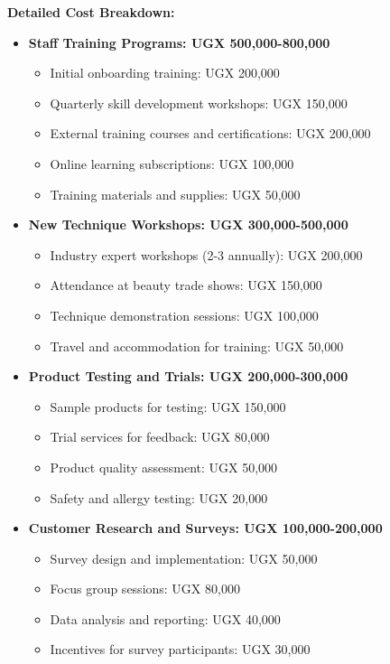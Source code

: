 \documentclass[a4paper,12pt]{article}
\begin{document}
\textbf{Detailed Cost Breakdown:}
\begin{itemize}[leftmargin=2em]
    \item \textbf{Staff Training Programs: UGX 500,000-800,000}
    \begin{itemize}
        \item Initial onboarding training: UGX 200,000
        \item Quarterly skill development workshops: UGX 150,000
        \item External training courses and certifications: UGX 200,000
        \item Online learning subscriptions: UGX 100,000
        \item Training materials and supplies: UGX 50,000
    \end{itemize}
    
    \item \textbf{New Technique Workshops: UGX 300,000-500,000}
    \begin{itemize}
        \item Industry expert workshops (2-3 annually): UGX 200,000
        \item Attendance at beauty trade shows: UGX 150,000
        \item Technique demonstration sessions: UGX 100,000
        \item Travel and accommodation for training: UGX 50,000
    \end{itemize}
    
    \item \textbf{Product Testing and Trials: UGX 200,000-300,000}
    \begin{itemize}
        \item Sample products for testing: UGX 150,000
        \item Trial services for feedback: UGX 80,000
        \item Product quality assessment: UGX 50,000
        \item Safety and allergy testing: UGX 20,000
    \end{itemize}
    
    \item \textbf{Customer Research and Surveys: UGX 100,000-200,000}
    \begin{itemize}
        \item Survey design and implementation: UGX 50,000
        \item Focus group sessions: UGX 80,000
        \item Data analysis and reporting: UGX 40,000
        \item Incentives for survey participants: UGX 30,000
    \end{itemize}
    

\end{itemize}
\end{document}
